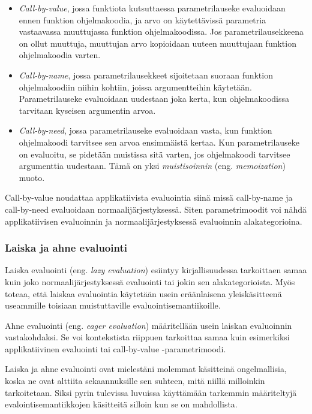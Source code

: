 \begin{itemize}
	\item \textit{Call-by-value}, jossa funktiota kutsuttaessa parametrilauseke evaluoidaan ennen funktion ohjelmakoodia, ja arvo on käytettävissä parametria vastaavassa muuttujassa funktion ohjelmakoodissa. Jos parametrilausekkeena on ollut muuttuja, muuttujan arvo kopioidaan uuteen muuttujaan funktion ohjelmakoodia varten. \citep{scott2009programming}
    \item \textit{Call-by-name}, jossa parametrilausekkeet sijoitetaan suoraan funktion ohjelmakoodiin niihin kohtiin, joissa argumentteihin käytetään. Parametrilauseke evaluoidaan uudestaan joka kerta, kun ohjelmakoodissa tarvitaan kyseisen argumentin arvoa. \citep{ariola1995callbyneed}
    \item \textit{Call-by-need}, jossa parametrilauseke evaluoidaan vasta, kun funktion ohjelmakoodi tarvitsee sen arvoa ensimmäistä kertaa. Kun parametrilauseke on evaluoitu, se pidetään muistissa sitä varten, jos ohjelmakoodi tarvitsee argumenttia uudestaan. Tämä on yksi \textit{muistisoinnin} (eng. \textit{memoization}) muoto. \citep{ariola1995callbyneed}
\end{itemize}

Call-by-value noudattaa applikatiivista evaluointia siinä missä call-by-name ja call-by-need evaluoidaan normaalijärjestyksessä. Siten parametrimoodit voi nähdä applikatiivisen evaluoinnin ja normaalijärjestyksessä evaluoinnin alakategorioina.

\subsubsection{Laiska ja ahne evaluointi}

Laiska evaluointi (eng. \textit{lazy evaluation}) esiintyy kirjallisuudessa tarkoittaen samaa kuin joko normaalijärjestyksessä evaluointi tai jokin sen alakategorioista. Myös \citet{scott2009programming} toteaa, että laiskaa evaluointia käytetään usein eräänlaisena yleiskäsitteenä useammille toisiaan muistuttaville evaluointisemantiikoille.

Ahne evaluointi (eng. \textit{eager evaluation}) määritellään usein laiskan evaluoinnin vastakohdaksi. Se voi kontekstista riippuen tarkoittaa samaa kuin esimerkiksi applikatiivinen evaluointi tai call-by-value -parametrimoodi.

Laiska ja ahne evaluointi ovat mielestäni molemmat käsitteinä ongelmallisia, koska ne ovat alttiita sekaannuksille sen suhteen, mitä niillä milloinkin tarkoitetaan. Siksi pyrin tulevissa luvuissa käyttämään tarkemmin määriteltyjä evalointisemantiikkojen käsitteitä silloin kun se on mahdollista.